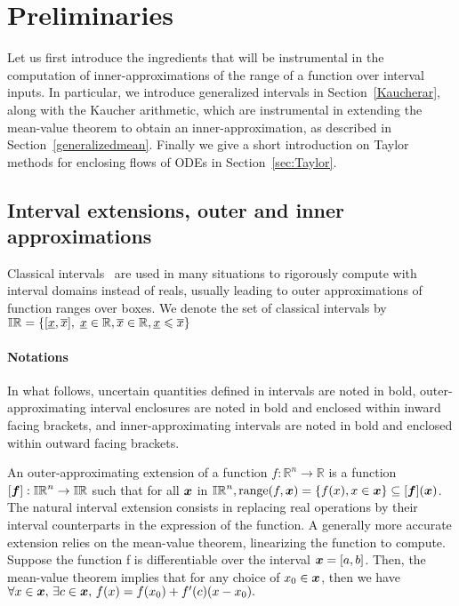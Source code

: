 \documentclass{sig-alternate-05-2015} %
\def\R{{\mathbb R}}
\def\bbr{{\Bbb R}}
\def\I{{\Bbb I \Bbb R}}
\begin{document}
\section{Preliminaries}
\label{prelim}

Let us first introduce the ingredients that will be instrumental in the computation of inner-approximations of
the range of a function over interval inputs. In particular, we introduce
generalized intervals in Section~\ref{Kaucherar}, along with the Kaucher arithmetic, which are instrumental in extending 
the mean-value theorem to obtain an inner-approximation, 
as described in Section~\ref{generalizedmean}. Finally we give a short introduction on Taylor methods for enclosing flows of ODEs in Section~\ref{sec:Taylor}. 

\subsection{Interval extensions, outer and inner approximations}
Classical intervals~\cite{Moore66,IA2001} are used in many situations to rigorously compute with interval
domains instead of reals, usually leading to outer approximations of function
ranges over boxes. 
We denote the set of classical intervals by $\I = \{ [\underline{x},\overline{x}], \; \underline{x} \in \bbr, \overline{x} \in \bbr,  \underline{x} \leqslant \overline{x} \}$
\paragraph{Notations}
In what follows, 
uncertain quantities defined in intervals are noted in bold, outer-approximating interval enclosures are noted in bold and enclosed within inward facing brackets, 
and inner-approximating intervals are noted in bold and enclosed within outward facing 
brackets.

 An outer-approximating extension of a function $f: \R^n \rightarrow \R $ is a function 
$[\f]: \I^n\rightarrow \I$ such that for all $\x$ in $\I^n, \mbox{range}(f,\x)=\{f(x), x \in \x\} \subseteq [\f](\x)$.
The natural interval extension consists in replacing real
operations by their interval counterparts in the expression of the function. 
A generally more accurate extension relies on the mean-value theorem, linearizing the 
function to compute. Suppose the function f is differentiable over the interval 
$\x = [a, b]$. Then, the mean-value theorem implies that for any choice of $x_0 \in \x$, then we have
$ \forall x \in \x, \, \exists c \in \x, \, f(x) = f(x_0) + f'(c) (x-x_0).$
\end{document}
